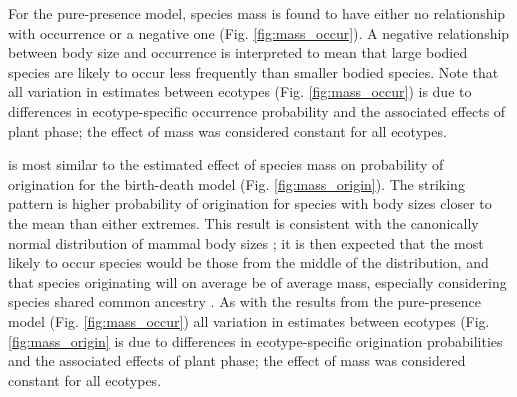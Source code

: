 \documentclass[12pt,letterpaper]{article}
\begin{document}
For the pure-presence model, species mass is found to have either no relationship with occurrence or a negative one (Fig. \ref{fig:mass_occur}). A negative relationship between body size and occurrence is interpreted to mean that large bodied species are likely to occur less frequently than smaller bodied species. Note that all variation in estimates between ecotypes (Fig. \ref{fig:mass_occur}) is due to differences in ecotype-specific occurrence probability and the associated effects of plant phase; the effect of mass was considered constant for all ecotypes.

is most similar to the estimated effect of species mass on probability of origination for the birth-death model (Fig. \ref{fig:mass_origin}). The striking pattern is higher probability of origination for species with body sizes closer to the mean than either extremes. This result is consistent with the canonically normal distribution of mammal body sizes \citep{Smith2004}; it is then expected that the most likely to occur species would be those from the middle of the distribution, and that species originating will on average be of average mass, especially considering species shared common ancestry \citep{Felsenstein1985b}. As with the results from the pure-presence model (Fig. \ref{fig:mass_occur}) all variation in estimates between ecotypes (Fig. \ref{fig:mass_origin} is due to differences in ecotype-specific origination probabilities and the associated effects of plant phase; the effect of mass was considered constant for all ecotypes.
\end{document}

